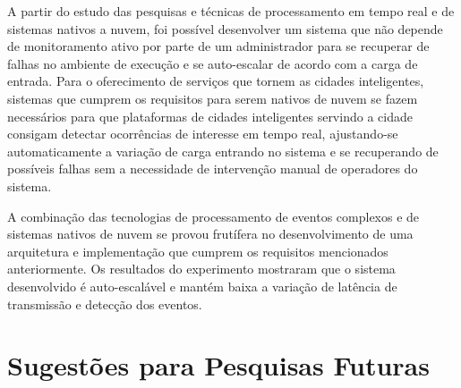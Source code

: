 A partir do estudo das pesquisas e técnicas de processamento em tempo real e de sistemas nativos a nuvem, foi possível desenvolver um sistema que não depende de monitoramento ativo por parte de um administrador para se recuperar de falhas no ambiente de execução e se auto-escalar de acordo com a carga de entrada. Para o oferecimento de serviços que tornem as cidades inteligentes, sistemas que cumprem os requisitos para serem nativos de nuvem se fazem necessários para que plataformas de cidades inteligentes servindo a cidade consigam detectar ocorrências de interesse em tempo real, ajustando-se automaticamente a variação de carga entrando no sistema e se recuperando de possíveis falhas sem a necessidade de intervenção manual de operadores do sistema.



A combinação das tecnologias de processamento de eventos complexos e de sistemas nativos de nuvem se provou frutífera no desenvolvimento de uma arquitetura e implementação que cumprem os requisitos mencionados anteriormente. 
Os resultados do experimento mostraram que o sistema desenvolvido é auto-escalável e mantém baixa a variação de latência de transmissão e detecção dos eventos.












\section{Sugestões para Pesquisas Futuras} 

